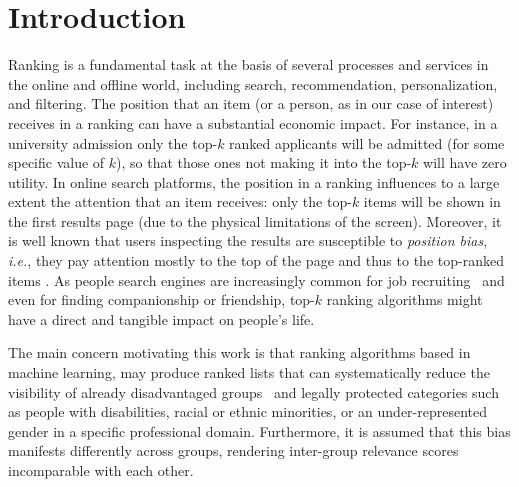 \section{Introduction}\label{sec:introduction}
Ranking is a fundamental task at the basis of several processes and services in the online and offline world, including search, recommendation, personalization, and filtering.
%
The position that an item (or a person, as in our case of interest) receives in a ranking can have a substantial economic impact.
%
For instance, in a university admission only the top-$k$ ranked applicants will be admitted (for some specific value of $k$), so that those ones not making it into the top-$k$ will have zero utility.
%
In online search platforms, the position in a ranking influences to a large extent the attention that an item receives: only the top-$k$ items will be shown in the first results page (due to the physical limitations of the screen). Moreover, it is well known that users inspecting the results are susceptible to \emph{position bias}, {\em i.e.}, they pay attention mostly to the top of the page and thus to the top-ranked items \cite{CraswellZTR08}.
%
As people search engines are increasingly common for job recruiting~\cite{raghavan2020mitigating} and even for finding companionship or friendship, top-$k$ ranking algorithms might have a direct and tangible impact on people's life.


The main concern motivating this work is that ranking algorithms based in machine learning, may produce ranked lists that can systematically reduce the visibility of already disadvantaged groups~\cite{peder2008,Dwork2012} and legally protected categories such as people with disabilities, racial or ethnic minorities, or an under-represented gender in a specific professional domain.
%
%
Furthermore, it is assumed that this bias manifests differently across groups, rendering inter-group relevance scores incomparable with each other.

